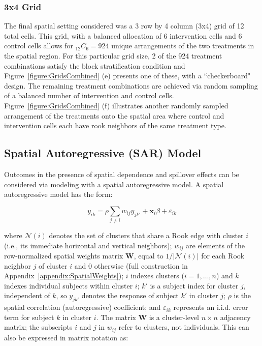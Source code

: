 \documentclass{article}[11pt]
\begin{document}
\subsubsection{3x4 Grid}

The final spatial setting considered was a 3 row by 4 column (3x4) grid of 12 total cells. This grid, with a balanced allocation of 6 intervention cells and 6 control cells allows for %
$_{12}C_{6}=924$ unique arrangements of the two treatments in the spatial region. For this particular grid size, 2 of the 924 treatment combinations satisfy the block stratification condition and Figure~\ref{figure:GridsCombined} (e) presents one of these, with a ``checkerboard" design. The remaining treatment combinations are achieved via random sampling of a balanced number of intervention and control cells. Figure~\ref{figure:GridsCombined} (f) illustrates another randomly sampled arrangement of the treatments onto the spatial area where control and intervention cells each have rook neighbors of the same treatment type.

\subsection{Spatial Autoregressive (SAR) Model}\label{section:SAR}

Outcomes in the presence of spatial dependence and spillover effects can be considered via modeling with a spatial autoregressive model\cite{waller_applied_2004}\cite{fotheringham_sage_2009}\cite{ullah_handbook_1998}. A spatial autoregressive model has the form:

\begin{equation}\label{Equation:SARmodel}
    y_{ik} = \rho\sum_{j \neq i} w_{ij}y_{jk'} + \mathbf{x}_i \beta + \varepsilon_{ik}
\end{equation}

\noindent where $\mathcal{N}(i)$ denotes the set of clusters that share a Rook edge with cluster $i$ (i.e., its immediate horizontal and vertical neighbors); $w_{ij}$ are elements of the row-normalized spatial weights matrix $\mathbf{W}$, equal to $1/|\mathcal{N}(i)|$ for each Rook neighbor $j$ of cluster $i$ and 0 otherwise (full construction in Appendix~\ref{appendix:SpatialWeights}); $i$ indexes clusters ($i = 1, \ldots, n$) and $k$ indexes individual subjects within cluster $i$; $k'$ is a subject index for cluster $j$, independent of $k$, so $y_{jk'}$ denotes the response of subject $k'$ in cluster $j$; $\rho$ is the spatial correlation (autoregressive) coefficient; and $\varepsilon_{ik}$ represents an i.i.d. error term for subject $k$ in cluster $i$. The matrix $\mathbf{W}$ is a cluster-level $n \times n$ adjacency matrix; the subscripts $i$ and $j$ in $w_{ij}$ refer to clusters, not individuals. This can also be expressed in matrix notation as:
\end{document}
